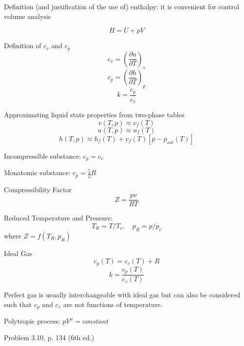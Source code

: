 \documentclass[paper=letter, fontsize=11pt]{scrartcl}
\numberwithin{equation}{section}        %
\numberwithin{figure}{section}          %
\numberwithin{table}{section}               %
\begin{document}
Definition (and justification of the use of) enthalpy: it is convenient for control volume analysis

\begin{equation}
    H=U+pV
\end{equation}

Definition of $c_v$ and $c_p$ 
\begin{equation}
    c_v = \left(\frac{\partial u}{\partial T}\right)_v
\end{equation}
\begin{equation}
    c_p = \left(\frac{\partial h}{\partial T}\right)_p
\end{equation}
\begin{equation}
    k = \frac{c_p}{c_v}
\end{equation}

Approximating liquid state properties from two-phase tables
\begin{equation}
    v(T,p)\approx v_f(T)
\end{equation}
\begin{equation}
    u(T,p)\approx u_f(T)
\end{equation}
\begin{equation}
    h(T,p)\approx h_f(T) + v_f(T)[p-p_{sat}(T)]
\end{equation}

Incompressible substance: $c_p=c_v$

Monatomic substance: $c_p=\frac{5}{2}R$

Compressibility Factor
\begin{equation}
    Z = \frac{pv}{RT}
\end{equation}

Reduced Temperature and Pressure:
\begin{equation}
    T_R = T/T_c,\quad p_R = p/p_c
\end{equation}
where $Z=f(T_R,p_R)$

Ideal Gas
\begin{equation}
    c_p(T) = c_v(T)+R
\end{equation}
\begin{equation}
    k = \frac{c_p(T)}{c_v(T)}
\end{equation}

Perfect gas is usually interchangeable with ideal gas but can also be considered such that $c_p$ and $c_v$ are not functions of temperature.

Polytropic process: $pV^n=constant$

Problem 3.10, p. 134 (6th ed.)
\end{document}
